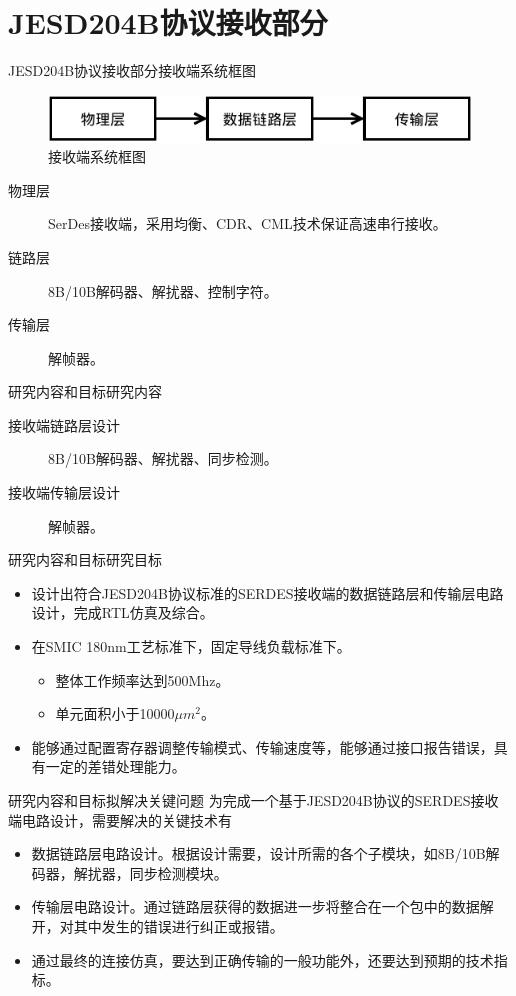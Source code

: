 \documentclass{beamer}
\begin{document}
\section{JESD204B协议接收部分}

\begin{frame}{JESD204B协议接收部分}{接收端系统框图}
	\begin{figure}
	\centering
	\includegraphics[scale=1]{./img/recv_layer.pdf}
	\caption{接收端系统框图}
	\end{figure}
  \begin{description}
  \item [物理层] SerDes接收端，采用均衡、CDR、CML技术保证高速串行接收。
  \item [链路层] 8B/10B解码器、解扰器、控制字符。
  \item [传输层] 解帧器。
  \end{description}
\end{frame}

\begin{frame}{研究内容和目标}{研究内容}
	\begin{description}
	\item [接收端链路层设计] 8B/10B解码器、解扰器、同步检测。
	\item [接收端传输层设计] 解帧器。
	\end{description}
\end{frame}


\begin{frame}{研究内容和目标}{研究目标}
	\begin{itemize}
	\item 设计出符合JESD204B协议标准的SERDES接收端的数据链路层和传输层电路设计，完成RTL仿真及综合。
	\item 在SMIC 180nm工艺标准下，固定导线负载标准下。
		\begin{itemize}
		\item 整体工作频率达到500Mhz。
		\item 单元面积小于10000$\mu m^2$。
		\end{itemize}
	\item 能够通过配置寄存器调整传输模式、传输速度等，能够通过接口报告错误，具有一定的差错处理能力。
	\end{itemize}
\end{frame}

\begin{frame}{研究内容和目标}{拟解决关键问题}
为完成一个基于JESD204B协议的SERDES接收端电路设计，需要解决的关键技术有
	\begin{itemize}
	\item 数据链路层电路设计。根据设计需要，设计所需的各个子模块，如8B/10B解码器，解扰器，同步检测模块。
	\item 传输层电路设计。通过链路层获得的数据进一步将整合在一个包中的数据解开，对其中发生的错误进行纠正或报错。
	\item 通过最终的连接仿真，要达到正确传输的一般功能外，还要达到预期的技术指标。
	\end{itemize}
\end{frame}
\end{document}
